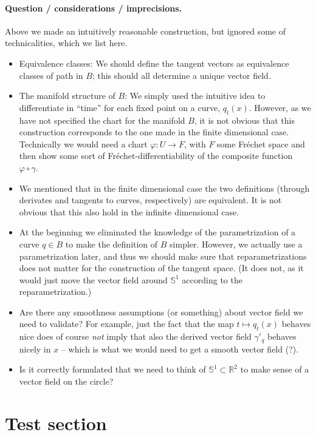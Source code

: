 \documentclass[a4,danish]{article}
\newcommand{\R}{\mathbb{R}}
\renewcommand{\S}{\mathbb{S}}
\renewcommand{\phi}{\varphi}
\begin{document}
\paragraph{Question / considerations / imprecisions.}
Above we made an intuitively reasonable construction, but ignored some
of technicalities, which we list here.
\begin{itemize}
\item Equivalence classes: We should define the tangent vectors as
  equivalence classes of path in $B$; this should all determine a
  unique vector field.
\item The manifold structure of $B$: We simply used the intuitive idea
  to differentiate in ``time'' for each fixed point on a curve,
  $q_t(x)$. However, as we have not specified the chart for the
  manifold $B$, it is not obvious that this construction corresponds
  to the one made in the finite dimensional case. Technically we
  would need a chart $\phi \colon U \rightarrow F$, with $F$ some
  Fr\'echet space and then show some sort of Fr\'echet-differentiability of the
  composite function $\phi \circ \gamma$.
\item We mentioned that in the finite dimensional case the two
  definitions (through derivates and tangents to curves, respectively)
  are equivalent. It is not obvious that this also hold in the
  infinite dimensional case.
\item At the beginning we eliminated the knowledge of the
  parametrization of a curve $q \in B$ to make the definition of $B$
  simpler. However, we actually use a parametrization later, and thus
  we should make sure that reparametrizations does not matter for the
  construction of the tangent space. (It does not, as it would just
  move the vector field around $\S^1$ according to the
  reparametrization.)
\item Are there any smoothness assumptions (or something) about vector
  field we need to validate? For example, just the fact that the map
  $t \mapsto q_t(x)$ behaves nice does of course \textit{not} imply
  that also the derived vector field $\gamma'_q$ behaves nicely in
  $x$ -- which is what we would need to get a smooth vector field
  (?).
\item Is it correctly formulated that we need to think of $\S^1
  \subset \R^2$ to make sense of a vector field on the circle?
\end{itemize}


\section*{Test section}
\label{sec:test-section}
\end{document}
